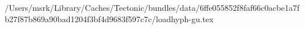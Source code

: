 /Users/msrk/Library/Caches/Tectonic/bundles/data/6ffe055852f8faf66c0acbe1a7fb27f87b869a90bad1204f3bf4d9683f597c7c/loadhyph-gu.tex